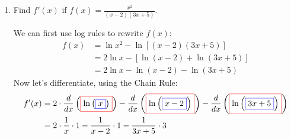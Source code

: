 \documentclass{article}
\begin{document}
\begin{enumerate}
\begin{enumerate}
\begin{enumerate}
    \begin{solution}
      We can decompose $e^{t^3}$ as $f(g(t))$ with $g(t) = t^3$ and $f(t)
      = e^t$.  Then, the Chain Rule says that $\frac{d}{dt} \left(e^{t^3}
      \right) = f'(g(t)) g'(t) = e^{t^3} \cdot 3t^2$, so $q'(t) =
      \boxed{3t^2 e^{t^3} - 12 e^2}$.

      Instead of writing out functions $f(t)$ and $g(t)$, we'll often
      write that we're going to use the Chain Rule simply by putting a red
      box around where we're going to use the Chain Rule ($e^{t^3}$ in
      this case) and then putting a blue box around the inner function
      $g(t)$: 
      \begin{align*}
        q'(t) &= \frac{d}{dt} \left(\fcolorbox{red}{white}{$\displaystyle
            e^ { \fcolorbox{blue}{white}{$\displaystyle t^ { 3} $}}
            $} - 12 e^2 t \right) \\ 
        &= e^ { t^ { 3} } \cdot 3 t^ { 2} -12 e^2
      \end{align*}
    \end{solution}
    
      \item 
      \begin{problem}[\vfill] Find $f'(x)$ if $\displaystyle f(x) =  \frac{x^2}{(x-2)(3x+5)}
      $. 
    \end{problem}

    \begin{solution}
      We can first use log rules to rewrite $f(x)$:
      \begin{align*}
        f(x) &= \ln x^2 - \ln [(x - 2) (3x + 5)] \\
        &= 2 \ln x - \left[ \ln(x - 2) + \ln (3x + 5)
        \right] \\
        &= 2 \ln x - \ln(x - 2) - \ln (3x + 5)
      \end{align*}
      Now let's differentiate, using the Chain Rule:
      \begin{align*}
        f'(x) = {} & 2 \cdot \frac{d}{dx} \left(\fcolorbox{red}{white}{$\displaystyle \ln\left(\fcolorbox{blue}{white}{$\displaystyle x$}\right)$}\right)-\frac{d}{dx} \left(\fcolorbox{red}{white}{$\displaystyle \ln\left(\fcolorbox{blue}{white}{$\displaystyle x-2$}\right)$}\right)-\frac{d}{dx} \left(\fcolorbox{red}{white}{$\displaystyle \ln\left(\fcolorbox{blue}{white}{$\displaystyle 3x+ 5$}\right)$}\right) \\
        = {} & 2\cdot \frac{1}{x}\cdot 1-\frac{1}{x-2}\cdot 1-\frac{1}{3x+ 5}\cdot 3
      \end{align*}
    \end{solution}
\end{enumerate}


\end{enumerate}
\end{enumerate}
\end{document}
